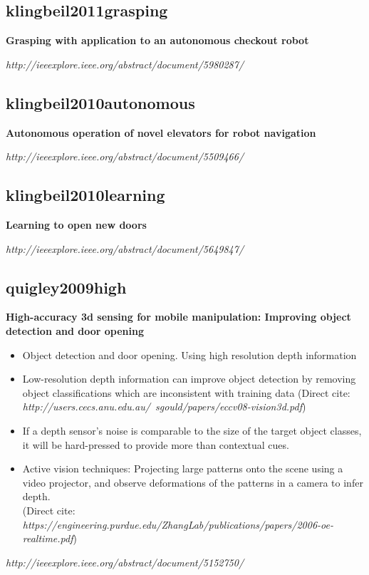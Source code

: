 \subsection{klingbeil2011grasping}
\textbf{Grasping with application to an autonomous checkout robot}

\textit{http://ieeexplore.ieee.org/abstract/document/5980287/}


\subsection{klingbeil2010autonomous}
\textbf{Autonomous operation of novel elevators for robot navigation}

\textit{http://ieeexplore.ieee.org/abstract/document/5509466/}

\subsection{klingbeil2010learning}
\textbf{Learning to open new doors}

\textit{http://ieeexplore.ieee.org/abstract/document/5649847/}

\subsection{quigley2009high}
\textbf{High-accuracy 3d sensing for mobile manipulation: Improving object detection and door opening}
\begin{itemize}
\item Object detection and door opening. Using high resolution depth information 
\item Low-resolution depth information can improve object detection by removing object classifications which are inconsistent with training data
(Direct cite: \textit{http://users.cecs.anu.edu.au/~sgould/papers/eccv08-vision3d.pdf})
\item If a depth sensor's noise is comparable to the size of the target object classes, it will be hard-pressed to provide more than contextual cues. 
\item Active vision techniques: Projecting large patterns onto the scene using a video projector, and observe deformations of the patterns in a camera to infer depth. \\
(Direct cite: \textit{https://engineering.purdue.edu/ZhangLab/publications/papers/2006-oe-realtime.pdf})

\end{itemize}
\textit{http://ieeexplore.ieee.org/abstract/document/5152750/}